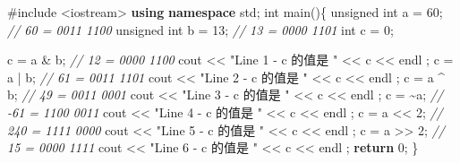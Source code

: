 \documentclass[
]{article}
\newenvironment{Shaded}{}{}
\newcommand{\CommentTok}[1]{\textcolor[rgb]{0.38,0.63,0.69}{\textit{#1}}}
\newcommand{\ControlFlowTok}[1]{\textcolor[rgb]{0.00,0.44,0.13}{\textbf{#1}}}
\newcommand{\DataTypeTok}[1]{\textcolor[rgb]{0.56,0.13,0.00}{#1}}
\newcommand{\DecValTok}[1]{\textcolor[rgb]{0.25,0.63,0.44}{#1}}
\newcommand{\ImportTok}[1]{#1}
\newcommand{\KeywordTok}[1]{\textcolor[rgb]{0.00,0.44,0.13}{\textbf{#1}}}
\newcommand{\NormalTok}[1]{#1}
\newcommand{\OperatorTok}[1]{\textcolor[rgb]{0.40,0.40,0.40}{#1}}
\newcommand{\PreprocessorTok}[1]{\textcolor[rgb]{0.74,0.48,0.00}{#1}}
\newcommand{\StringTok}[1]{\textcolor[rgb]{0.25,0.44,0.63}{#1}}
\begin{document}
\begin{Shaded}
\begin{Highlighting}[]
\PreprocessorTok{\#include }\ImportTok{\textless{}iostream\textgreater{}}
\KeywordTok{using} \KeywordTok{namespace}\NormalTok{ std}\OperatorTok{;} 
\DataTypeTok{int}\NormalTok{ main}\OperatorTok{()\{}
   \DataTypeTok{unsigned} \DataTypeTok{int}\NormalTok{ a }\OperatorTok{=} \DecValTok{60}\OperatorTok{;}      \CommentTok{// 60 = 0011 1100  }
   \DataTypeTok{unsigned} \DataTypeTok{int}\NormalTok{ b }\OperatorTok{=} \DecValTok{13}\OperatorTok{;}      \CommentTok{// 13 = 0000 1101}
   \DataTypeTok{int}\NormalTok{ c }\OperatorTok{=} \DecValTok{0}\OperatorTok{;}           
 
\NormalTok{   c }\OperatorTok{=}\NormalTok{ a }\OperatorTok{\&}\NormalTok{ b}\OperatorTok{;}             \CommentTok{// 12 = 0000 1100}
\NormalTok{   cout }\OperatorTok{\textless{}\textless{}} \StringTok{"Line 1 {-} c 的值是 "} \OperatorTok{\textless{}\textless{}}\NormalTok{ c }\OperatorTok{\textless{}\textless{}}\NormalTok{ endl }\OperatorTok{;} 
\NormalTok{   c }\OperatorTok{=}\NormalTok{ a }\OperatorTok{|}\NormalTok{ b}\OperatorTok{;}             \CommentTok{// 61 = 0011 1101}
\NormalTok{   cout }\OperatorTok{\textless{}\textless{}} \StringTok{"Line 2 {-} c 的值是 "} \OperatorTok{\textless{}\textless{}}\NormalTok{ c }\OperatorTok{\textless{}\textless{}}\NormalTok{ endl }\OperatorTok{;} 
\NormalTok{   c }\OperatorTok{=}\NormalTok{ a }\OperatorTok{\^{}}\NormalTok{ b}\OperatorTok{;}             \CommentTok{// 49 = 0011 0001}
\NormalTok{   cout }\OperatorTok{\textless{}\textless{}} \StringTok{"Line 3 {-} c 的值是 "} \OperatorTok{\textless{}\textless{}}\NormalTok{ c }\OperatorTok{\textless{}\textless{}}\NormalTok{ endl }\OperatorTok{;} 
\NormalTok{   c }\OperatorTok{=} \OperatorTok{\textasciitilde{}}\NormalTok{a}\OperatorTok{;}                \CommentTok{// {-}61 = 1100 0011}
\NormalTok{   cout }\OperatorTok{\textless{}\textless{}} \StringTok{"Line 4 {-} c 的值是 "} \OperatorTok{\textless{}\textless{}}\NormalTok{ c }\OperatorTok{\textless{}\textless{}}\NormalTok{ endl }\OperatorTok{;} 
\NormalTok{   c }\OperatorTok{=}\NormalTok{ a }\OperatorTok{\textless{}\textless{}} \DecValTok{2}\OperatorTok{;}            \CommentTok{// 240 = 1111 0000}
\NormalTok{   cout }\OperatorTok{\textless{}\textless{}} \StringTok{"Line 5 {-} c 的值是 "} \OperatorTok{\textless{}\textless{}}\NormalTok{ c }\OperatorTok{\textless{}\textless{}}\NormalTok{ endl }\OperatorTok{;} 
\NormalTok{   c }\OperatorTok{=}\NormalTok{ a }\OperatorTok{\textgreater{}\textgreater{}} \DecValTok{2}\OperatorTok{;}            \CommentTok{// 15 = 0000 1111}
\NormalTok{   cout }\OperatorTok{\textless{}\textless{}} \StringTok{"Line 6 {-} c 的值是 "} \OperatorTok{\textless{}\textless{}}\NormalTok{ c }\OperatorTok{\textless{}\textless{}}\NormalTok{ endl }\OperatorTok{;} 
   \ControlFlowTok{return} \DecValTok{0}\OperatorTok{;}
\OperatorTok{\}}
\end{Highlighting}
\end{Shaded}
\end{document}
